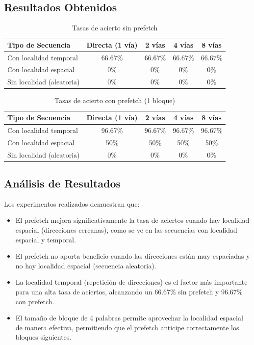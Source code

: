 \documentclass[14pt]{article}
\begin{document}
\subsection*{Resultados Obtenidos}

\begin{table}[H]
\centering
\caption{Tasas de acierto sin prefetch}
\begin{tabular}{|l|c|c|c|c|}
\hline
\textbf{Tipo de Secuencia} & \textbf{Directa (1 vía)} & \textbf{2 vías} & \textbf{4 vías} & \textbf{8 vías} \\
\hline
Con localidad temporal & 66.67\% & 66.67\% & 66.67\% & 66.67\% \\
\hline
Con localidad espacial & 0\% & 0\% & 0\% & 0\% \\
\hline
Sin localidad (aleatoria) & 0\% & 0\% & 0\% & 0\% \\
\hline
\end{tabular}
\end{table}

\begin{table}[H]
\centering
\caption{Tasas de acierto con prefetch (1 bloque)}
\begin{tabular}{|l|c|c|c|c|}
\hline
\textbf{Tipo de Secuencia} & \textbf{Directa (1 vía)} & \textbf{2 vías} & \textbf{4 vías} & \textbf{8 vías} \\
\hline
Con localidad temporal & 96.67\% & 96.67\% & 96.67\% & 96.67\% \\
\hline
Con localidad espacial & 50\% & 50\% & 50\% & 50\% \\
\hline
Sin localidad (aleatoria) & 0\% & 0\% & 0\% & 0\% \\
\hline
\end{tabular}
\end{table}

\subsection*{Análisis de Resultados}

Los experimentos realizados demuestran que:

\begin{itemize}
    \item El prefetch mejora significativamente la tasa de aciertos cuando hay localidad espacial (direcciones cercanas), como se ve en las secuencias con localidad espacial y temporal.
    \item El prefetch no aporta beneficio cuando las direcciones están muy espaciadas y no hay localidad espacial (secuencia aleatoria).
    \item La localidad temporal (repetición de direcciones) es el factor más importante para una alta tasa de aciertos, alcanzando un 66.67\% sin prefetch y 96.67\% con prefetch.
    \item El tamaño de bloque de 4 palabras permite aprovechar la localidad espacial de manera efectiva, permitiendo que el prefetch anticipe correctamente los bloques siguientes.
\end{itemize}
\end{document}
